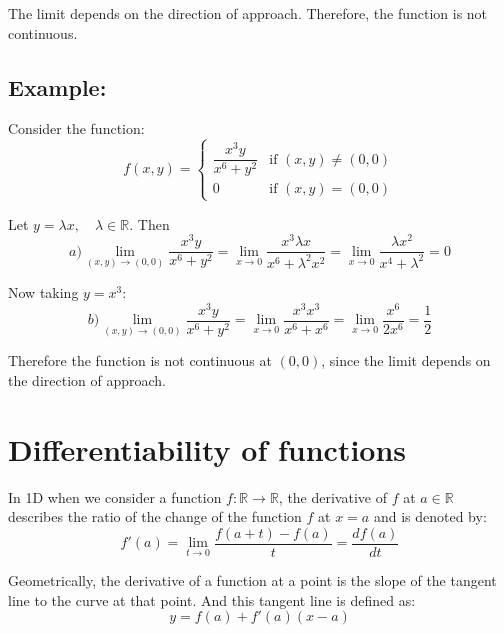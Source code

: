 \documentclass[11pt]{article}
\begin{document}
The limit depends on the direction of approach. Therefore, the function is not continuous.

\subsection*{Example:}
Consider the function:
\[
f(x,y) =
\begin{cases}
    \dfrac{x^3y}{x^6 + y^2} & \text{if } (x,y) \neq (0,0) \\
    0 & \text{if } (x,y) = (0,0)
\end{cases}
\]

Let $y = \lambda x, \quad \lambda \in \mathbb{R}$. Then
\[
a) \lim_{(x,y) \to (0,0)} \frac{x^3y}{x^6 + y^2} = \lim_{x \to 0} \frac{x^3 \lambda x}{x^6 + \lambda^2 x^2} = \lim_{x \to 0} \frac{\lambda x^2}{x^4 + \lambda^2} = 0
\]

Now taking $y = x^3$:
\[
b) \lim_{(x,y) \to (0,0)} \frac{x^3y}{x^6 + y^2} = \lim_{x \to 0} \frac{x^3 x^3}{x^6 + x^6} = \lim_{x \to 0} \frac{x^6}{2x^6} = \frac{1}{2}
\]

Therefore the function is not continuous at $(0,0)$, since the limit depends on the direction of approach.

\section{Differentiability of functions}
In 1D when we consider a function $f : \mathbb{R} \rightarrow \mathbb{R}$, the derivative of $f$ at $a \in \mathbb{R}$ describes the ratio of the change of the function $f$ at $x = a$ and is denoted by:
\[
f'(a) = \lim_{t \to 0} \frac{f(a + t) - f(a)}{t} = \frac{df(a)}{dt}
\]

Geometrically, the derivative of a function at a point is the slope of the tangent line to the curve at that point. And this tangent line is defined as:
\[
y = f(a) + f'(a)(x - a)
\]
\end{document}
